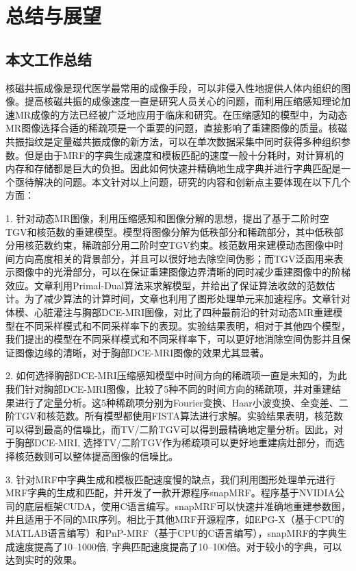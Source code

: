 \chapter{总结与展望}
\label{chap:future}

\section{本文工作总结}
核磁共振成像是现代医学最常用的成像手段，可以非侵入性地提供人体内组织的图像。提高核磁共振的成像速度一直是研究人员关心的问题，而利用压缩感知理论加速MR成像的方法已经被广泛地应用于临床和研究。在压缩感知的模型中，为动态MR图像选择合适的稀疏项是一个重要的问题，直接影响了重建图像的质量。核磁共振指纹是定量磁共振成像的新方法，可以在单次数据采集中同时获得多种组织参数。但是由于MRF的字典生成速度和模板匹配的速度一般十分耗时，对计算机的内存和存储都是巨大的负担。因此如何快速并精确地生成字典并进行字典匹配是一个亟待解决的问题。本文针对以上问题，研究的内容和创新点主要体现在以下几个方面：

1. 针对动态MR图像，利用压缩感知和图像分解的思想，提出了基于二阶时空TGV和核范数的重建模型。模型将图像分解为低秩部分和稀疏部分，其中低秩部分用核范数约束，稀疏部分用二阶时空TGV约束。核范数用来建模动态图像中时间方向高度相关的背景部分，并且可以很好地去除空间伪影；而TGV泛函用来表示图像中的光滑部分，可以在保证重建图像边界清晰的同时减少重建图像中的阶梯效应。文章利用Primal-Dual算法来求解模型，并给出了保证算法收敛的范数估计。为了减少算法的计算时间，文章也利用了图形处理单元来加速程序。文章针对体模、心脏灌注与胸部DCE-MRI图像，对比了四种最前沿的针对动态MR重建模型在不同采样模式和不同采样率下的表现。实验结果表明，相对于其他四个模型，我们提出的模型在不同采样模式和不同采样率下，可以更好地消除空间伪影并且保证图像边缘的清晰，对于胸部DCE-MRI图像的效果尤其显著。

2. 如何选择胸部DCE-MRI压缩感知模型中时间方向的稀疏项一直是未知的，为此我们针对胸部DCE-MRI图像，比较了5种不同的时间方向的稀疏项，并对重建结果进行了定量分析。这5种稀疏项分别为Fourier变换、Haar小波变换、全变差、二阶TGV和核范数。所有模型都使用FISTA算法进行求解。实验结果表明，核范数可以得到最高的信噪比，而TV/二阶TGV可以得到最精确地定量分析。因此，对于胸部DCE-MRI, 选择TV/二阶TGV作为稀疏项可以更好地重建病灶部分，而选择核范数则可以整体提高图像的信噪比。

3. 针对MRF中字典生成和模板匹配速度慢的缺点，我们利用图形处理单元进行MRF字典的生成和匹配，并开发了一款开源程序snapMRF。程序基于NVIDIA公司的底层框架CUDA，使用C语言编写。snapMRF可以快速并准确地重建参数图，并且适用于不同的MR序列。相比于其他MRF开源程序，如EPG-X（基于CPU的MATLAB语言编写）和PnP-MRF（基于CPU的C语言编写），snapMRF的字典生成速度提高了10--1000倍, 字典匹配速度提高了10--100倍。对于较小的字典，可以达到实时的效果。

